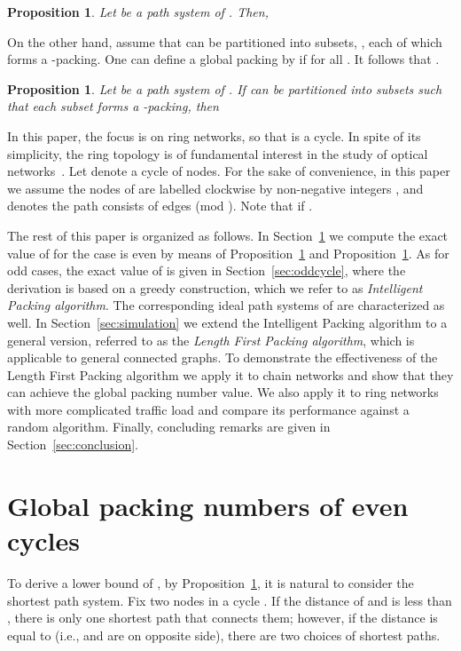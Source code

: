 \documentclass[journal,draftcls,onecolumn,12pt,twoside]{IEEEtran}
\newtheorem{proposition}[theorem]{\bf Proposition}
\begin{document}
\begin{proposition}\label{pro:lowerbound}
Let  be a path system of .
Then,

\end{proposition}

On the other hand, assume that  can be partitioned into  subsets, , each of which forms a -packing. 
One can define a global packing by  if  for all . 
It follows that .

\begin{proposition}\label{pro:upperbound}
Let  be a path system of .
If  can be partitioned into  subsets such that each subset forms a -packing, then

\end{proposition}

In this paper, the focus is on ring networks, so that  is a cycle.
In spite of its simplicity, the ring topology is of fundamental interest in the study of optical networks~\cite{GCFPFGNP_01,GSCAC_09,PCF_05}.
Let  denote a cycle of  nodes.
For the sake of convenience, in this paper we assume the nodes of  are labelled clockwise by non-negative integers , and  denotes the path consists of edges  (mod ).
Note that  if .

The rest of this paper is organized as follows.
In Section~\ref{sec:evencycle} we compute the exact value of  for the case  is even by means of Proposition~\ref{pro:lowerbound} and Proposition~\ref{pro:upperbound}. 
As for odd  cases, the exact value of  is given in Section~\ref{sec:oddcycle}, where the derivation is based on a greedy construction, which we refer to as
{\em Intelligent Packing algorithm}.
The corresponding ideal path systems of  are characterized as well.
In Section~\ref{sec:simulation} we extend the Intelligent Packing algorithm to a general version, referred to as the {\em Length First Packing algorithm}, which is applicable to
general connected graphs.  To demonstrate the effectiveness of the Length First
Packing algorithm we apply it to chain networks and show that they can achieve the global packing number value. 
We also apply it to ring networks with more complicated traffic
load and compare its performance against a random algorithm.
Finally, concluding remarks are given in Section~\ref{sec:conclusion}.


\section{Global packing numbers of even cycles}\label{sec:evencycle}
To derive a lower bound of , by Proposition~\ref{pro:lowerbound}, it is natural to consider the shortest path system.
Fix two nodes  in a cycle .
If the distance of  and  is less than , there is only one shortest path that connects them; however, if the distance is equal to  (i.e.,  and  are on opposite side), there are two choices of shortest paths.
\end{document}
